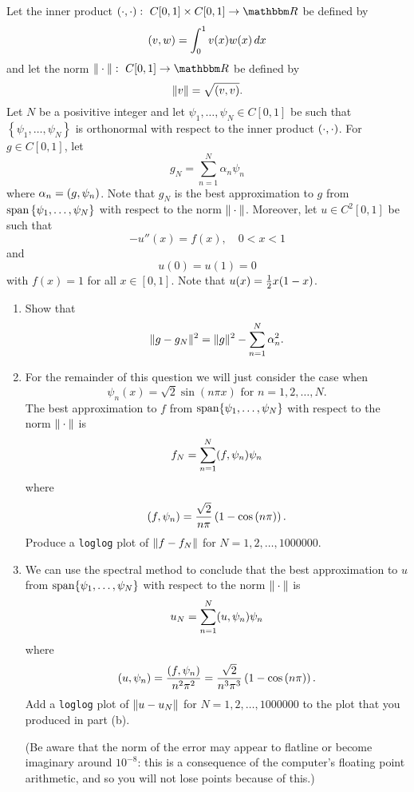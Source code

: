 Let the inner product $\ip{\cdot,\cdot}:\mbox{ }C[0,1]\times C[0,1]\rightarrow\R$ be defined by
\[
(v,w)=\int_0^1v(x)w(x)\,dx
\]
and let the norm $\norm{\cdot}:\mbox{ }C[0,1]\rightarrow\R$ be defined by
\[
\|v\|=\sqrt{(v,v)}.
\]
Let $N$ be a posivitive integer and let $\psi_1,\ldots,\psi_N\in C[0,1]$ be such that $\left\{\psi_1,\ldots,\psi_N\right\}$ is orthonormal with respect to the inner product $(\cdot,\cdot)$. For $g\in C[0,1]$, let
\[
g_N=\sum_{n=1}^N\alpha_n\psi_n
\]
where $\alpha_n=(g,\psi_n)$. Note that $g_N$ is the best approximation to $g$ from ${\rm span}\left\{\psi_1,\ldots,\psi_N\right\}$ with respect to the norm $\|\cdot\|$. Moreover, let $u\in C^2[0,1]$ be such that
\[
-u''(x)=f(x),\quad 0<x<1
\]
and
\[
u(0)=u(1)=0
\]
with $f(x)=1$ for all $x\in[0,1]$. Note that $u(x) = {1 \over 2}x(1-x)$.

\begin{enumerate}
\item Show that
\[
\|g-g_N\|^2  = \|g\|^2 - \sum_{n=1}^N \alpha_n^2.
\]

\item For the remainder of this question we will just consider the case when
\[
\psi_n(x) = \sqrt{2} \sin(n \pi x)\mbox{ for }n=1,2,\ldots,N.
\]
The best approximation to $f$ from ${\rm span}\{\psi_1, \ldots, \psi_N\}$ with respect to the norm $\|\cdot\|$ is
\[ 
f_N = \sum_{n=1}^N (f,\psi_n) \psi_n
\]
where
\[
(f,\psi_n)={\sqrt{2} \over n\pi}\left(1-\cos\left(n\pi\right)\right).
\]
Produce a \verb|loglog| plot of $\|f-f_N\|$ for $N=1,2,\ldots, 1000000$.

\item We can use the spectral method to conclude that the best approximation to $u$ from ${\rm span}\{\psi_1, \ldots, \psi_N\}$ with respect to the norm $\|\cdot\|$ is
\[ 
u_N = \sum_{n=1}^N (u,\psi_n) \psi_n
\]
where
\[
(u,\psi_n)={(f,\psi_n) \over n^2\pi^2}={\sqrt{2} \over n^3\pi^3}\left(1-\cos\left(n\pi\right)\right).
\]
Add a \verb|loglog| plot of $\|u-u_N\|$ for $N=1,2,\ldots, 1000000$ to the plot that you produced in part (b).

(Be aware that the norm of the error may appear to flatline or become imaginary around $10^{-8}$: this is a consequence of the computer's floating point arithmetic, and so you will not lose points because of this.)
\end{enumerate}



